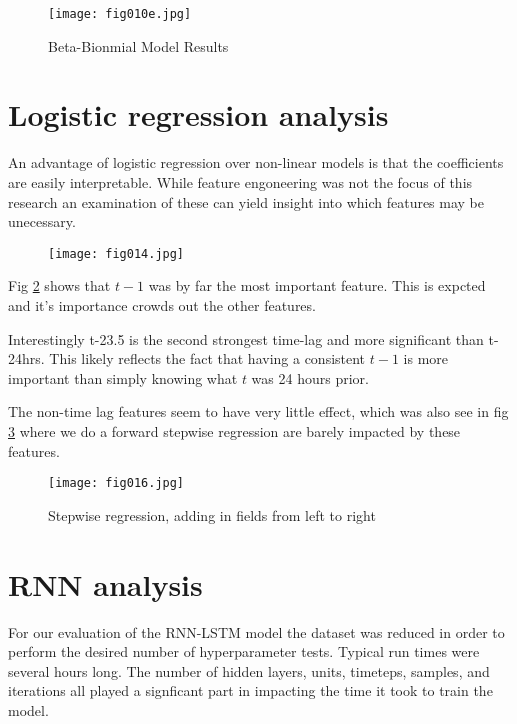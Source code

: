 \begin{figure}[h!]
	\centering
	\texttt{[image: fig010e.jpg]}
	\caption{Beta-Bionmial Model Results}
	\label{fig10e}
\end{figure} 

\section{Logistic regression analysis}

An advantage of logistic regression over non-linear models is that the coefficients are easily interpretable. While feature engoneering was not the focus of this research an examination of these can yield insight into which features may be unecessary. 

\begin{figure}[h!]
	\centering
	\texttt{[image: fig014.jpg]}
	\caption{}
	\label{fig14}
\end{figure} 

Fig \ref{fig14} shows that $t-1$ was by far the most important feature. This is expcted and it's importance crowds out the other features.

Interestingly t-23.5 is the second strongest time-lag and more significant than t-24hrs. This likely reflects the fact that having a consistent $t-1$ is more important than simply knowing what $t$ was 24 hours prior.

The non-time lag features seem to have very little effect, which was also see in fig \ref{fig16} where we do a forward stepwise regression are barely impacted by these features.

\begin{figure}[h!]
	\centering
	\texttt{[image: fig016.jpg]}
	\caption{Stepwise regression, adding in fields from left to right}
	\label{fig16}
\end{figure} 

\section{RNN analysis}

For our evaluation of the RNN-LSTM model the dataset was reduced in order to perform the desired number of hyperparameter tests. Typical run times were several hours long. The number of hidden layers, units, timeteps, samples, and iterations all played a signficant part in impacting the time it took to train the model. 

